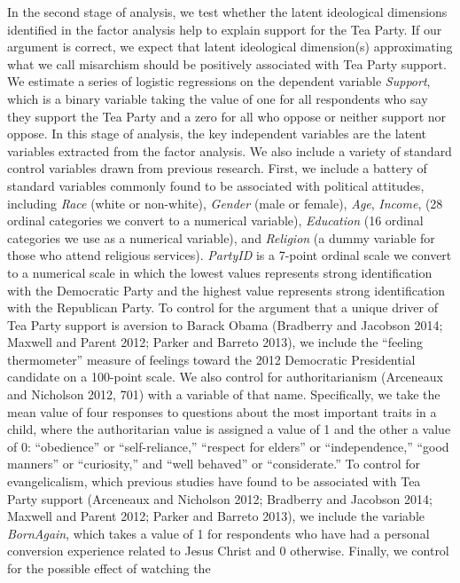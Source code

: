 \documentclass[12pt,]{article}
\begin{document}
In the second stage of analysis, we test whether the latent ideological
dimensions identified in the factor analysis help to explain support for
the Tea Party. If our argument is correct, we expect that latent
ideological dimension(s) approximating what we call misarchism should be
positively associated with Tea Party support. We estimate a series of
logistic regressions on the dependent variable \emph{Support}, which is
a binary variable taking the value of one for all respondents who say
they support the Tea Party and a zero for all who oppose or neither
support nor oppose. In this stage of analysis, the key independent
variables are the latent variables extracted from the factor analysis.
We also include a variety of standard control variables drawn from
previous research. First, we include a battery of standard variables
commonly found to be associated with political attitudes, including
\emph{Race} (white or non-white), \emph{Gender} (male or female),
\emph{Age}, \emph{Income}, (28 ordinal categories we convert to a
numerical variable), \emph{Education} (16 ordinal categories we use as a
numerical variable), and \emph{Religion} (a dummy variable for those who
attend religious services). \emph{PartyID} is a 7-point ordinal scale we
convert to a numerical scale in which the lowest values represents
strong identification with the Democratic Party and the highest value
represents strong identification with the Republican Party. To control
for the argument that a unique driver of Tea Party support is aversion
to Barack Obama (Bradberry and Jacobson 2014; Maxwell and Parent 2012;
Parker and Barreto 2013), we include the ``feeling thermometer'' measure
of feelings toward the 2012 Democratic Presidential candidate on a
100-point scale. We also control for authoritarianism (Arceneaux and
Nicholson 2012, 701) with a variable of that name. Specifically, we take
the mean value of four responses to questions about the most important
traits in a child, where the authoritarian value is assigned a value of
1 and the other a value of 0: ``obedience'' or ``self-reliance,''
``respect for elders'' or ``independence,'' ``good manners'' or
``curiosity,'' and ``well behaved'' or ``considerate.'' To control for
evangelicalism, which previous studies have found to be associated with
Tea Party support (Arceneaux and Nicholson 2012; Bradberry and Jacobson
2014; Maxwell and Parent 2012; Parker and Barreto 2013), we include the
variable \emph{BornAgain}, which takes a value of 1 for respondents who
have had a personal conversion experience related to Jesus Christ and 0
otherwise. Finally, we control for the possible effect of watching the
\end{document}
